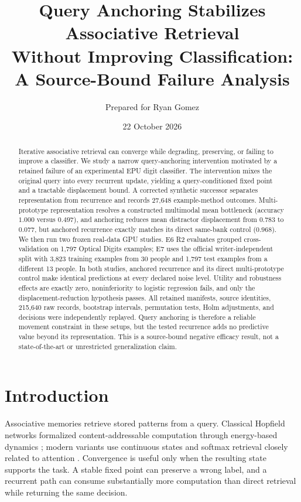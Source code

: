 \documentclass[11pt]{article}
\title{Query Anchoring Stabilizes Associative Retrieval\\Without Improving Classification:\\A Source-Bound Failure Analysis}
\author{Prepared for Ryan Gomez}
\date{22 October 2026}
\begin{document}
\maketitle

\begin{abstract}
Iterative associative retrieval can converge while degrading, preserving, or failing to improve a classifier. We study a narrow query-anchoring intervention motivated by a retained failure of an experimental EPU digit classifier. The intervention mixes the original query into every recurrent update, yielding a query-conditioned fixed point and a tractable displacement bound. A corrected synthetic successor separates representation from recurrence and records 27,648 example-method outcomes. Multi-prototype representation resolves a constructed multimodal mean bottleneck (accuracy $1.000$ versus $0.497$), and anchoring reduces mean distractor displacement from $0.783$ to $0.077$, but anchored recurrence exactly matches its direct same-bank control ($0.968$). We then run two frozen real-data GPU studies. E6 R2 evaluates grouped cross-validation on 1,797 Optical Digits examples; E7 uses the official writer-independent split with 3,823 training examples from 30 people and 1,797 test examples from a different 13 people. In both studies, anchored recurrence and its direct multi-prototype control make identical predictions at every declared noise level. Utility and robustness effects are exactly zero, noninferiority to logistic regression fails, and only the displacement-reduction hypothesis passes. All retained manifests, source identities, 215,640 raw records, bootstrap intervals, permutation tests, Holm adjustments, and decisions were independently replayed. Query anchoring is therefore a reliable movement constraint in these setups, but the tested recurrence adds no predictive value beyond its representation. This is a source-bound negative efficacy result, not a state-of-the-art or unrestricted generalization claim.
\end{abstract}

\section{Introduction}
Associative memories retrieve stored patterns from a query. Classical Hopfield networks formalized content-addressable computation through energy-based dynamics \cite{hopfield1982}; modern variants use continuous states and softmax retrieval closely related to attention \cite{ramsauer2020}. Convergence is useful only when the resulting state supports the task. A stable fixed point can preserve a wrong label, and a recurrent path can consume substantially more computation than direct retrieval while returning the same decision.
\end{document}
